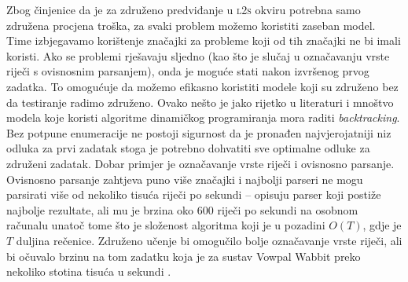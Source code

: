 Zbog činjenice da je za združeno predviđanje u \textsc{l2s} okviru potrebna samo
združena procjena troška, za svaki problem možemo koristiti zaseban model. Time
izbjegavamo korištenje značajki za probleme koji od tih značajki ne bi imali
koristi. Ako se problemi rješavaju sljedno (kao što je slučaj u označavanju
vrste riječi s ovisnosnim parsanjem), onda je moguće stati nakon izvršenog prvog
zadatka. To omogućuje da možemo efikasno koristiti modele koji su združeno bez
da testiranje radimo združeno. Ovako nešto je jako rijetko u literaturi i
mnoštvo modela koje koristi algoritme dinamičkog programiranja mora raditi
\textit{backtracking}. Bez potpune enumeracije ne postoji sigurnost da je
pronađen najvjerojatniji niz odluka za prvi zadatak stoga je potrebno dohvatiti
sve optimalne odluke za združeni zadatak. Dobar primjer je označavanje vrste
riječi i ovisnosno parsanje. Ovisnosno parsanje zahtjeva puno više značajki i
najbolji parseri ne mogu parsirati više od nekoliko tisuća riječi po sekundi --
\citep{andor2016globally} opisuju parser koji postiže najbolje rezultate, ali mu
je brzina oko 600 riječi po sekundi na osobnom računalu unatoč tome što je
složenost algoritma koji je u pozadini $O(T)$, gdje je $T$ duljina rečenice.
Združeno učenje bi omogučilo bolje označavanje vrste riječi, ali bi očuvalo
brzinu na tom zadatku koja je za sustav Vowpal Wabbit preko nekoliko stotina
tisuća u sekundi \citep{daume14lts}.
